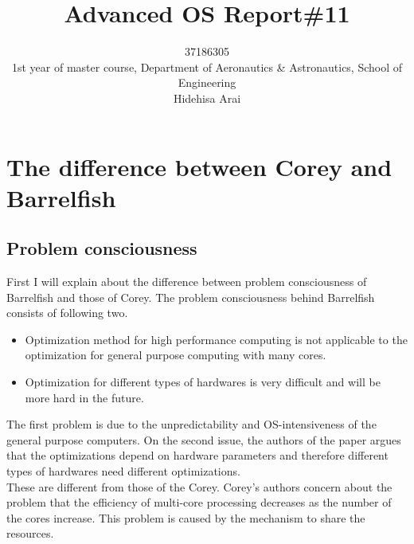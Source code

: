 \documentclass[10pt,a4paper]{ltjsarticle}       %
\title{Advanced OS Report\#11}
\author{37186305\\1st year of master course, Department of Aeronautics \& Astronautics, School of Engineering\\Hidehisa Arai}
\begin{document}
\maketitle
\section{The difference between Corey and Barrelfish}
\subsection{Problem consciousness}
First I will explain about the difference between problem consciousness of Barrelfish and those of Corey. The problem consciousness behind Barrelfish consists of following two.
\begin{itemize}
  \item Optimization method for high performance computing is not applicable to the optimization for general purpose computing with many cores.
  \item Optimization for different types of hardwares is very difficult and will be more hard in the future.
\end{itemize} 
The first problem is due to the unpredictability and OS-intensiveness of the general purpose computers. On the second issue, the authors of the paper argues that the optimizations depend on hardware parameters and therefore different types of hardwares need different optimizations.\\
These are different from those of the Corey. Corey's authors concern about the problem that the efficiency of multi-core processing decreases as the number of the cores increase. This problem is caused by the mechanism to share the resources.
\end{document}
